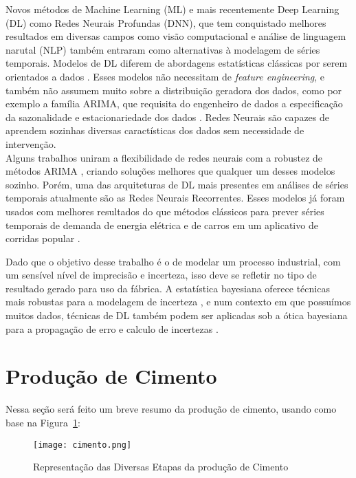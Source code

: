 Novos métodos de Machine Learning (ML) e mais recentemente Deep Learning (DL)
como Redes Neurais Profundas (DNN), que tem conquistado melhores resultados em
diversas campos como visão computacional e análise de linguagem narutal (NLP)
também entraram como alternativas à modelagem de séries temporais. Modelos de DL diferem de abordagens estatísticas clássicas por serem orientados a dados \citep{dlbook}. Esses modelos não necessitam de \textit{feature engineering}, e também não assumem muito sobre a distribuição geradora dos dados, como por exemplo a família ARIMA, que requisita do engenheiro de dados a especificação da sazonalidade e estacionariedade dos dados \citep{arima}. Redes Neurais são capazes de aprendem sozinhas diversas caractísticas dos dados sem necessidade de intervenção. \\
Alguns trabalhos uniram a flexibilidade de redes neurais com a robustez de métodos ARIMA \citep{DIAZROBLES20088331,KHASHEI2010479}, criando soluções melhores que qualquer um desses modelos sozinho. Porém, uma das arquiteturas de DL mais presentes em análises de séries temporais
atualmente são as Redes Neurais Recorrentes. Esses modelos já foram usados com
melhores resultados do que métodos clássicos para prever séries temporais de
demanda de energia elétrica e de carros em um aplicativo de corridas popular
\cite{energylstm,ubertime}.

Dado que o objetivo desse trabalho é o de modelar um processo industrial, com
um sensível nível de imprecisão e incerteza, isso deve se refletir no tipo de
resultado gerado para uso da fábrica. A estatística bayesiana oferece técnicas
mais robustas para a modelagem de incerteza \cite{bayesml}, e num contexto em
que possuímos muitos dados, técnicas de DL também podem ser aplicadas sob a
ótica bayesiana para a propagação de erro e calculo de incertezas \cite{ubertime,Gal2016Uncertainty}. 



\section{Produção de Cimento}
\label{sec:producao}

Nessa seção será feito um breve resumo da produção de cimento, usando como base na Figura~\ref{fig:cement}: \\ 

\begin{figure}[H]
\label{fig:cement}
\centering
\texttt{[image: cimento.png]}
\caption{Representação das Diversas Etapas da produção de Cimento \citep{cementroadmap}}
\end{figure}


